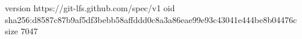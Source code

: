 version https://git-lfs.github.com/spec/v1
oid sha256:d8587c87b9af5df3bebb58affddd0c8a3a86eae99e93c43041e444be8b04476c
size 7047
